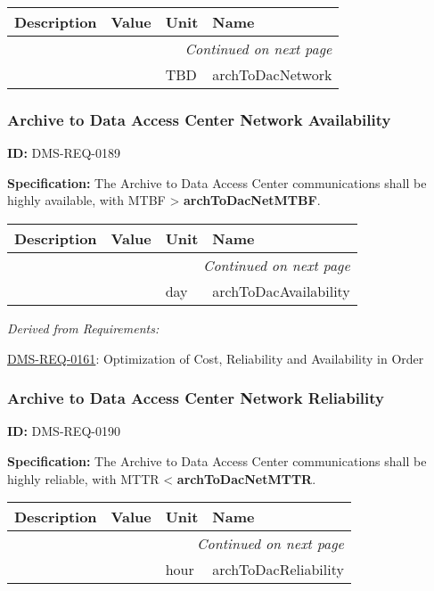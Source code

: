 \documentclass[SE,toc,lsstdraft]{lsstdoc}
\makeatletter
\newcommand{\paramname}[1]{\hspace{0pt}#1}
\newcommand{\unitname}[1]{\hspace{0pt}#1}
\newenvironment{parameters}[0]{%
\setlength\LTleft{0pt}
\setlength\LTright{\fill}
\begin{small}
\begin{longtable}[]{|p{0.5\textwidth}|l|p{0.6in}|p{1.74in}@{}|}

\hline \textbf{Description} & \textbf{Value} & \textbf{Unit} & \textbf{Name} \\ \hline
\endhead

\hline \multicolumn{4}{r}{\emph{Continued on next page}} \\
\endfoot

\hline\hline
\endlastfoot
}{%
\hline
\end{longtable}
\end{small}
}
\makeatother
\begin{document}
\begin{parameters}

&

&
\unitname{%
TBD
}
&
\paramname{%
archToDacNetwork
} \\\hline
\end{parameters}




\subsubsection{Archive to Data Access Center Network Availability}

\label{DMS-REQ-0189}
\textbf{ID:} DMS-REQ-0189

\textbf{Specification:} The Archive to Data Access Center communications shall be highly available, with MTBF > \textbf{archToDacNetMTBF}.





\begin{parameters}

&

&
\unitname{%
day
}
&
\paramname{%
archToDacAvailability
} \\\hline
\end{parameters}




\emph{Derived from Requirements:}

\hyperref[DMS-REQ-0161]{DMS-REQ-0161}:
Optimization of Cost, Reliability and Availability in Order \newline


\subsubsection{Archive to Data Access Center Network Reliability}

\label{DMS-REQ-0190}
\textbf{ID:} DMS-REQ-0190

\textbf{Specification:} The Archive to Data Access Center communications shall be highly reliable, with MTTR < \textbf{archToDacNetMTTR}.





\begin{parameters}

&

&
\unitname{%
hour
}
&
\paramname{%
archToDacReliability
} \\\hline
\end{parameters}
\end{document}
